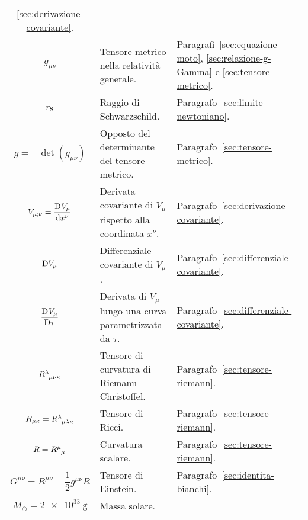 \begin{longtable}{c
    p{}
    p{}}
  \ref{sec:derivazione-covariante}. \\
  $g_{\mu\nu}$ & Tensore metrico nella relatività generale. &
  Paragrafi~\ref{sec:equazione-moto}, \ref{sec:relazione-g-Gamma} e
  \ref{sec:tensore-metrico}. \\
  $r_{\textup{S}}$ & Raggio di Schwarzschild. &
  Paragrafo~\ref{sec:limite-newtoniano}. \\[1.6ex]
  $g = -\det(g_{\mu\nu})$ & Opposto del determinante del tensore metrico. &
  Paragrafo~\ref{sec:tensore-metrico}. \\
  $V_{\mu;\nu} = \displaystyle\frac{{\mathop{}\!\mathrm{D}^{}}V_{\mu}}{\mathop{}\!\mathrm{d} {x^{\nu}}^{}}$ & Derivata covariante
  di $V_{\mu}$ rispetto alla coordinata $x^{\nu}$. &
  Paragrafo~\ref{sec:derivazione-covariante}. \\
  $\mathop{}\!\mathrm{D} V_{\mu}$ & Differenziale covariante di $V_{\mu}$. &
  Paragrafo~\ref{sec:differenziale-covariante}. \\[1.6ex]
  $\displaystyle\frac{{\mathop{}\!\mathrm{D}^{}}V_{\mu}}{\mathop{}\!\mathrm{D} \tau^{}}$ & Derivata di $V_{\mu}$ lungo una curva
  parametrizzata da $\tau$. & Paragrafo~\ref{sec:differenziale-covariante}. \\
  $\tensor{R}{^{\lambda}_{\mu\nu\kappa}}$ & Tensore di curvatura di
  Riemann-Christoffel. & Paragrafo~\ref{sec:tensore-riemann}. \\
  $R_{\mu\kappa} = \tensor{R}{^{\lambda}_{\mu\lambda\kappa}}$ & Tensore di
  Ricci. & Paragrafo~\ref{sec:tensore-riemann}. \\[1.6ex]
  $R = \tensor{R}{^{\mu}_{\mu}}$ & Curvatura scalare. &
  Paragrafo~\ref{sec:tensore-riemann}. \\[1.6ex]
  $G^{\mu\nu} = R^{\mu\nu} - \dfrac{1}{2} g^{\mu\nu}R$ & Tensore di Einstein. &
  Paragrafo~\ref{sec:identita-bianchi}. \\[1.6ex]
  $M_{\odot} = \SI{2e33}{\gram}$ & Massa solare. & \\
\end{longtable}


